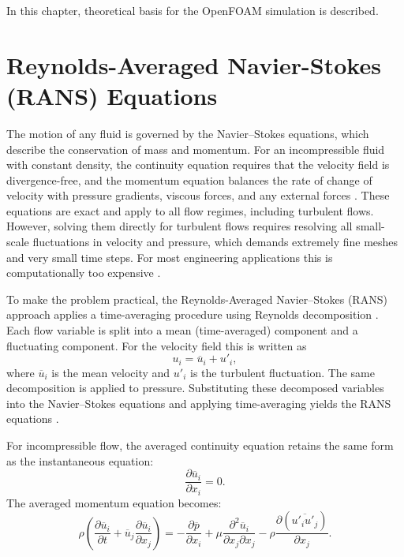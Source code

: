 In this chapter, theoretical basis for the OpenFOAM simulation is described. 
\section{Reynolds-Averaged Navier-Stokes (RANS) Equations}
\label{sec:rans_theory}

The motion of any fluid is governed by the Navier--Stokes equations, which describe the conservation of mass and momentum. For an incompressible fluid with constant density, the continuity equation requires that the velocity field is divergence-free, and the momentum equation balances the rate of change of velocity with pressure gradients, viscous forces, and any external forces \cite{Pope2000TurbulentFlows,VersteegMalalasekera2007CFD}. These equations are exact and apply to all flow regimes, including turbulent flows. However, solving them directly for turbulent flows requires resolving all small-scale fluctuations in velocity and pressure, which demands extremely fine meshes and very small time steps. For most engineering applications this is computationally too expensive \cite{Pope2000TurbulentFlows}.

To make the problem practical, the Reynolds-Averaged Navier--Stokes (RANS) approach applies a time-averaging procedure using Reynolds decomposition \cite{Pope2000TurbulentFlows,Wilcox2006TurbulenceModeling}. Each flow variable is split into a mean (time-averaged) component and a fluctuating component. For the velocity field this is written as
\begin{equation}
u_i = \overline{u}_i + u'_i ,
\end{equation}
where $\overline{u}_i$ is the mean velocity and $u'_i$ is the turbulent fluctuation. The same decomposition is applied to pressure. Substituting these decomposed variables into the Navier--Stokes equations and applying time-averaging yields the RANS equations \cite{Pope2000TurbulentFlows,VersteegMalalasekera2007CFD}.

For incompressible flow, the averaged continuity equation retains the same form as the instantaneous equation:
\begin{equation}
\frac{\partial \overline{u}_i}{\partial x_i} = 0 .
\end{equation}
The averaged momentum equation becomes:
\begin{equation}
\rho\left(
\frac{\partial \overline{u}_i}{\partial t}
+
\overline{u}_j \frac{\partial \overline{u}_i}{\partial x_j}
\right)
=
-\frac{\partial \overline{p}}{\partial x_i}
+
\mu \frac{\partial^2 \overline{u}_i}{\partial x_j \partial x_j}
-
\rho \frac{\partial \left(\overline{u'_i u'_j}\right)}{\partial x_j} .
\end{equation}

